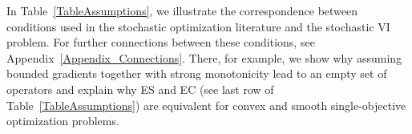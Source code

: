 \documentclass{article}
\begin{document}
In Table~\ref{TableAssumptions}, we illustrate the correspondence between conditions used in the stochastic optimization literature and the stochastic VI problem. For further connections between these conditions, see Appendix~\ref{Appendix_Connections}. There, for example, we show why assuming bounded gradients together with strong monotonicity lead to an empty set of operators and explain why ES and EC (see last row of Table~\ref{TableAssumptions}) are equivalent for convex and smooth single-objective optimization problems.
\begin{table}[tb]
\caption{Correspondence of Assumptions between Optimization and Variational Inequalities}
\label{TableAssumptions}
\begin{center}
\vspace{-5mm}
\end{center}
\end{table}
\end{document}
